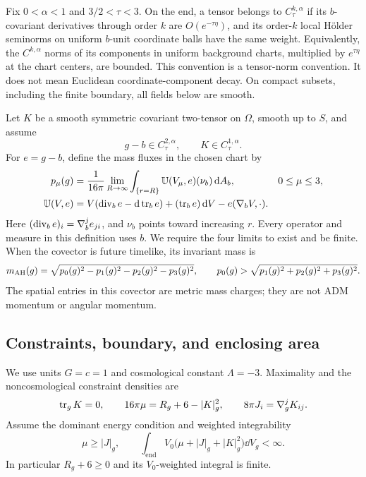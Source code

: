 Fix $0<\alpha<1$ and $3/2<\tau<3$. On the end, a tensor belongs to
$C^{k,\alpha}_\tau$ if its $b$-covariant derivatives through order $k$
are $O(e^{-\tau\eta})$, and its order-$k$ local H\"older seminorms
on uniform $b$-unit coordinate balls have the same weight. Equivalently,
the $C^{k,\alpha}$ norms of its components in uniform background charts,
multiplied by $e^{\tau\eta}$ at the chart centers, are bounded.
This convention is a tensor-norm convention. It does not mean
Euclidean coordinate-component decay. On compact subsets, including
the finite boundary, all fields below are smooth.

Let $K$ be a smooth symmetric covariant two-tensor on $\Omega$, smooth
up to $S$, and assume
\begin{equation}\label{eq:decay}
 g-b\in C^{2,\alpha}_\tau,
 \qquad K\in C^{1,\alpha}_\tau.
\end{equation}
For $e=g-b$, define the mass fluxes in the chosen chart by
\begin{align}\label{eq:ah-mass}
 p_\mu(g)&=\frac1{16\pi}\lim_{R\to\infty}
       \int_{\{r=R\}}\mathbb U(V_\mu,e)(\nu_b)\mathop{}\!\mathrm d A_b,
       &&0\le\mu\le3,\\
 \mathbb U(V,e)&=V(\operatorname{div}_b e-\mathop{}\!\mathrm d\operatorname{tr}_b e)
              +(\operatorname{tr}_b e)\mathop{}\!\mathrm d V-e(\nabla_b V,\cdot).
              \label{eq:mass-integrand}
\end{align}
Here $(\operatorname{div}_b e)_i=\nabla_b^j e_{ji}$, and $\nu_b$ points toward
increasing $r$. Every operator and measure in this definition uses $b$.
We require the four limits to exist and be finite. When the covector
is future timelike, its invariant mass is
\begin{equation}\label{eq:invariant-mass}
 m_{\mathrm{AH}}(g)=\sqrt{p_0(g)^2-p_1(g)^2-p_2(g)^2-p_3(g)^2},
 \qquad p_0(g)>\sqrt{p_1(g)^2+p_2(g)^2+p_3(g)^2}.
\end{equation}
The spatial entries in this covector are metric mass charges; they are
not ADM momentum or angular momentum.

\subsection{Constraints, boundary, and enclosing area}

We use units $G=c=1$ and cosmological constant $\Lambda=-3$.
Maximality and the noncosmological constraint densities are
\begin{equation}\label{eq:constraints}
 \operatorname{tr}_gK=0,
 \qquad 16\pi\mu=R_g+6-|K|_g^2,
 \qquad 8\pi J_i=\nabla_g^jK_{ij}.
\end{equation}
Assume the dominant energy condition and weighted integrability
\begin{equation}\label{eq:dec-integrability}
 \mu\ge|J|_g,
 \qquad \int_{\mathrm{end}}V_0
       \bigl(\mu+|J|_g+|K|_g^2\bigr)\dd V_g<\infty.
\end{equation}
In particular $R_g+6\ge0$ and its $V_0$-weighted integral is finite.

